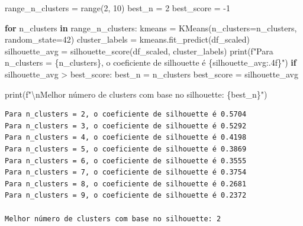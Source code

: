 \documentclass[
  letterpaper,
  DIV=11,
  numbers=noendperiod]{scrartcl}
\newenvironment{Shaded}{\begin{snugshade}}{\end{snugshade}}
\newcommand{\BuiltInTok}[1]{\textcolor[rgb]{0.00,0.23,0.31}{#1}}
\newcommand{\CharTok}[1]{\textcolor[rgb]{0.13,0.47,0.30}{#1}}
\newcommand{\ControlFlowTok}[1]{\textcolor[rgb]{0.00,0.23,0.31}{\textbf{#1}}}
\newcommand{\DecValTok}[1]{\textcolor[rgb]{0.68,0.00,0.00}{#1}}
\newcommand{\KeywordTok}[1]{\textcolor[rgb]{0.00,0.23,0.31}{\textbf{#1}}}
\newcommand{\NormalTok}[1]{\textcolor[rgb]{0.00,0.23,0.31}{#1}}
\newcommand{\OperatorTok}[1]{\textcolor[rgb]{0.37,0.37,0.37}{#1}}
\newcommand{\SpecialCharTok}[1]{\textcolor[rgb]{0.37,0.37,0.37}{#1}}
\newcommand{\SpecialStringTok}[1]{\textcolor[rgb]{0.13,0.47,0.30}{#1}}
\begin{document}
\begin{Shaded}
\begin{Highlighting}[]
\NormalTok{range\_n\_clusters }\OperatorTok{=} \BuiltInTok{range}\NormalTok{(}\DecValTok{2}\NormalTok{, }\DecValTok{10}\NormalTok{)}
\NormalTok{best\_n }\OperatorTok{=} \DecValTok{2}
\NormalTok{best\_score }\OperatorTok{=} \OperatorTok{{-}}\DecValTok{1}

\ControlFlowTok{for}\NormalTok{ n\_clusters }\KeywordTok{in}\NormalTok{ range\_n\_clusters:}
\NormalTok{    kmeans }\OperatorTok{=}\NormalTok{ KMeans(n\_clusters}\OperatorTok{=}\NormalTok{n\_clusters, random\_state}\OperatorTok{=}\DecValTok{42}\NormalTok{)}
\NormalTok{    cluster\_labels }\OperatorTok{=}\NormalTok{ kmeans.fit\_predict(df\_scaled)}
\NormalTok{    silhouette\_avg }\OperatorTok{=}\NormalTok{ silhouette\_score(df\_scaled, cluster\_labels)}
    \BuiltInTok{print}\NormalTok{(}\SpecialStringTok{f"Para n\_clusters = }\SpecialCharTok{\{}\NormalTok{n\_clusters}\SpecialCharTok{\}}\SpecialStringTok{, o coeficiente de silhouette é }\SpecialCharTok{\{}\NormalTok{silhouette\_avg}\SpecialCharTok{:.4f\}}\SpecialStringTok{"}\NormalTok{)}
    \ControlFlowTok{if}\NormalTok{ silhouette\_avg }\OperatorTok{\textgreater{}}\NormalTok{ best\_score:}
\NormalTok{        best\_n }\OperatorTok{=}\NormalTok{ n\_clusters}
\NormalTok{        best\_score }\OperatorTok{=}\NormalTok{ silhouette\_avg}

\BuiltInTok{print}\NormalTok{(}\SpecialStringTok{f"}\CharTok{\textbackslash{}n}\SpecialStringTok{Melhor número de clusters com base no silhouette: }\SpecialCharTok{\{}\NormalTok{best\_n}\SpecialCharTok{\}}\SpecialStringTok{"}\NormalTok{)}
\end{Highlighting}
\end{Shaded}

\begin{verbatim}
Para n_clusters = 2, o coeficiente de silhouette é 0.5704
Para n_clusters = 3, o coeficiente de silhouette é 0.5292
Para n_clusters = 4, o coeficiente de silhouette é 0.4198
Para n_clusters = 5, o coeficiente de silhouette é 0.3869
Para n_clusters = 6, o coeficiente de silhouette é 0.3555
Para n_clusters = 7, o coeficiente de silhouette é 0.3754
Para n_clusters = 8, o coeficiente de silhouette é 0.2681
Para n_clusters = 9, o coeficiente de silhouette é 0.2372

Melhor número de clusters com base no silhouette: 2
\end{verbatim}
\end{document}
